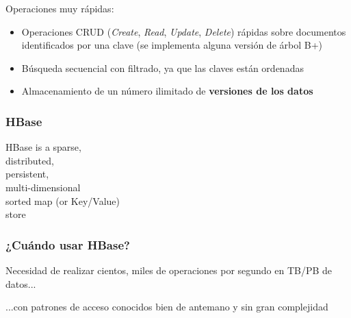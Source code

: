 \documentclass[14pt]{beamer}
\begin{document}
\begin{frame}[allowframebreaks]
\framebreak

 Operaciones muy rápidas:
  \begin{itemize}
  \item Operaciones CRUD ({\em Create}, {\em Read}, {\em Update}, {\em
      Delete}) rápidas sobre documentos identificados por una clave (se
    implementa alguna versión de árbol B+)
\item Búsqueda secuencial con filtrado, ya que las claves están ordenadas
\item Almacenamiento de un número ilimitado de {\bf versiones de los datos}
  \end{itemize}

\end{frame}

\begin{frame}
  \frametitle{HBase}
  \begin{block}{}
    {\Large  HBase is a {\color{red} sparse},\\ {\color{green} distributed},\\
      {\color{blue} persistent},\\ {\color{red} multi-dimensional} \\
      {\color{green} sorted map} (or Key/Value) \\ {\color{blue} store}}
  \end{block}
\end{frame}

\begin{frame}
  \frametitle{¿Cuándo usar HBase?}

  \begin{block}{}
    Necesidad de realizar cientos, miles de operaciones por segundo en
    TB/PB de datos...
  \end{block}

  \begin{block}{}
    ...con patrones de acceso conocidos bien de antemano y sin gran
    complejidad
  \end{block}

\end{frame}
\end{document}
